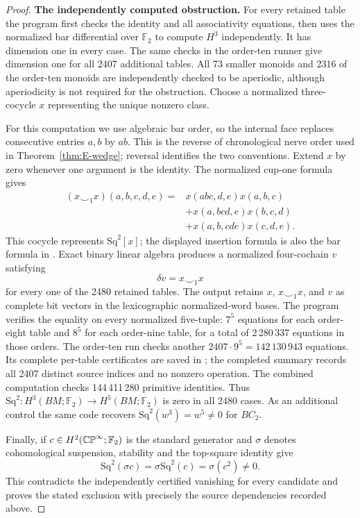 \begin{proof}
\textbf{The independently computed obstruction.}
For every retained table the program
 first checks the identity and all
associativity equations, then uses the normalized bar differential
over $\mathbb F_2$ to compute $H^3$ independently. It has dimension
one in every case. The same checks in the order-ten runner give
dimension one for all 2407 additional tables. All 73 smaller monoids
and 2316 of the order-ten monoids are independently checked to be
aperiodic, although aperiodicity is not required for the obstruction.
Choose a normalized three-cocycle $x$ representing the unique
nonzero class.

For this computation we use algebraic bar order, so the internal
face replaces consecutive entries $a,b$ by $ab$. This is the reverse
of chronological nerve order used in Theorem~\ref{thm:E-wedge};
reversal identifies the two conventions. Extend $x$ by zero whenever
one argument is the identity. The normalized cup-one formula gives
\[
\begin{split}
 (x\smile_1x)(a,b,c,d,e)
   ={}&x(abc,d,e)x(a,b,c)\\
      &+x(a,bcd,e)x(b,c,d)\\
      &+x(a,b,cde)x(c,d,e).
\end{split}
\]
This cocycle represents $\mathrm{Sq}^2[x]$; the displayed insertion
formula is also the bar formula in \cite[Theorem~3.7 and its preceding
definition]{lodder2018}. Exact binary linear algebra produces a
normalized four-cochain $v$ satisfying
\[
                 \delta v=x\smile_1x
\]
for every one of the 2480 retained tables. The output retains $x$, $x\smile_1x$, and
$v$ as complete bit vectors in the lexicographic normalized-word
bases. The program verifies the equality on every normalized
five-tuple: $7^5$ equations for each order-eight table and $8^5$
for each order-nine table, for a total of 2\,280\,337 equations in
those orders. The order-ten run checks another
$2407\cdot9^5=142\,130\,943$ equations. Its complete per-table
certificates are saved in
; the completed summary
records all 2407 distinct source indices and no nonzero operation.
The combined computation checks 144\,411\,280 primitive identities.
Thus $\mathrm{Sq}^2:H^3(BM;\mathbb F_2)\to H^5(BM;\mathbb F_2)$
is zero in all 2480 cases. As an additional control the same code
recovers $\mathrm{Sq}^2(w^3)=w^5\ne0$ for $BC_2$.

Finally, if $c\in H^2(\mathbb {CP}^\infty;\mathbb F_2)$ is the standard
generator and $\sigma$ denotes cohomological suspension, stability
and the top-square identity give
\[
 \mathrm{Sq}^2(\sigma c)
       =\sigma\mathrm{Sq}^2(c)=\sigma(c^2)\ne0.
\]
This contradicts the independently certified vanishing for every
candidate and proves the stated exclusion with precisely the
source dependencies recorded above.
\end{proof}

